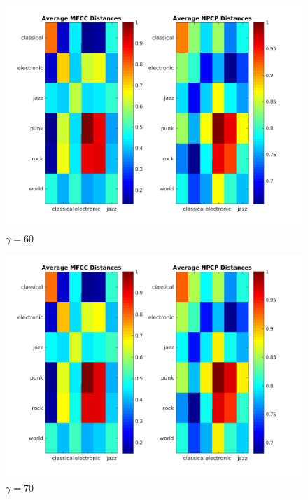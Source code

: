 \documentclass[11pt, a4paper]{article}
\begin{document}
\begin{figure}[H]
\hspace*{-2cm}    
    \centering
    \includegraphics[width=1.25\textwidth]{average60.png}
    \caption{$\gamma = 60$}
\end{figure}

\begin{figure}[H]
\hspace*{-2cm}    
    \centering
    \includegraphics[width=1.25\textwidth]{average70.png}
    \caption{$\gamma = 70$}
\end{figure}
\end{document}
